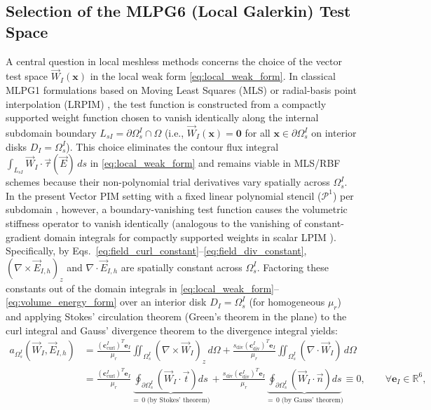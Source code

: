 \documentclass[VANCOUVER]{USG}
\begin{document}
\subsection{Selection of the MLPG6 (Local Galerkin) Test Space}
\label{subsec:mlpg6_selection}

A central question in local meshless methods concerns the choice of the vector test space $\vec{W}_I(\mathbf{x})$ in the local weak form \eqref{eq:local_weak_form}. In classical MLPG1 formulations based on Moving Least Squares (MLS) \cite{atluri1998new, atluri2002meshless} or radial-basis point interpolation (LRPIM) \cite{liu2005introduction}, the test function is constructed from a compactly supported weight function chosen to vanish identically along the internal subdomain boundary $L_{sI} = \partial\Omega_s^I \cap \Omega$ (i.e., $\vec{W}_I(\mathbf{x}) = \mathbf{0}$ for all $\mathbf{x} \in \partial\Omega_s^I$ on interior disks $D_I = \Omega_s^I$). This choice eliminates the contour flux integral $\int_{L_{sI}} \vec{W}_I \cdot \vec{\tau}(\vec{E}) \, ds$ in \eqref{eq:local_weak_form} and remains viable in MLS/RBF schemes because their non-polynomial trial derivatives vary spatially across $\Omega_s^I$. In the present Vector PIM setting with a fixed linear polynomial stencil ($\mathcal{P}^1$) per subdomain \cite{liu2001local, stable_vnmm2d_2026}, however, a boundary-vanishing test function causes the volumetric stiffness operator to vanish identically (analogous to the vanishing of constant-gradient domain integrals for compactly supported weights in scalar LPIM \cite{liu2001local}). Specifically, by Eqs.~\eqref{eq:field_curl_constant}--\eqref{eq:field_div_constant}, $(\nabla \times \vec{E}_{I,h})_z$ and $\nabla \cdot \vec{E}_{I,h}$ are spatially constant across $\Omega_s^I$. Factoring these constants out of the domain integrals in \eqref{eq:local_weak_form}--\eqref{eq:volume_energy_form} over an interior disk $D_I = \Omega_s^I$ (for homogeneous $\mu_r$) and applying Stokes' circulation theorem (Green's theorem in the plane) to the curl integral and Gauss' divergence theorem to the divergence integral yields:
\begin{equation}
    \begin{aligned}
        a_{\Omega_s^I}(\vec{W}_I, \vec{E}_{I,h}) & = \frac{(\mathbf{c}_{\mathrm{curl}}^I)^T \mathbf{e}_I}{\mu_r} \iint_{\Omega_s^I} (\nabla \times \vec{W}_I)_z \, d\Omega + \frac{s_{\mathrm{div}} (\mathbf{c}_{\mathrm{div}}^I)^T \mathbf{e}_I}{\mu_r} \iint_{\Omega_s^I} (\nabla \cdot \vec{W}_I) \, d\Omega \\
                                                 & = \frac{(\mathbf{c}_{\mathrm{curl}}^I)^T \mathbf{e}_I}{\mu_r} \underbrace{\oint_{\partial\Omega_s^I} \left(\vec{W}_I \cdot \vec{t}\right) ds}_{=\,0 \;\text{(by Stokes' theorem)}} + \frac{s_{\mathrm{div}} (\mathbf{c}_{\mathrm{div}}^I)^T \mathbf{e}_I}{\mu_r} \underbrace{\oint_{\partial\Omega_s^I} \left(\vec{W}_I \cdot \vec{n}\right) ds}_{=\,0 \;\text{(by Gauss' theorem)}} \equiv 0, \qquad \forall \mathbf{e}_I \in \mathbb{R}^6,
    \end{aligned}
    \label{eq:mlpg1_stiffness_collapse}
\end{equation}
\end{document}
